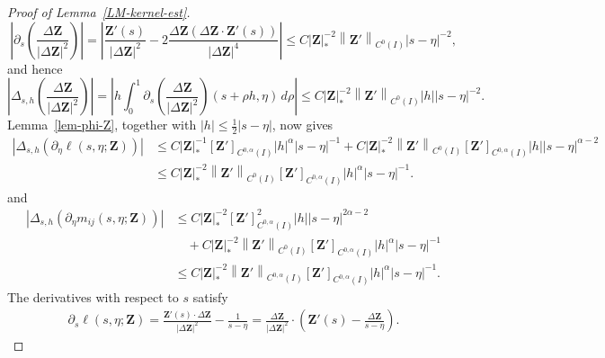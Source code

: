 \documentclass[11pt,reqno]{amsart}
\theoremstyle{plain}
\theoremstyle{definition}
\numberwithin{equation}{section}
\newcommand{\paren}[1]{\left(#1\right)}
\newcommand{\p}{\partial}
\newcommand{\bm}[1]{\boldsymbol{#1}}
\newcommand{\abs}[1]{\left\lvert #1 \right\rvert}
\newcommand{\norm}[1]{\left\lVert #1 \right\rVert}
\newcommand{\ci}[1]{C^{#1}(I)}
\begin{document}
\begin{proof}[Proof of Lemma~\ref{LM-kernel-est}]
\begin{equation}
    \abs{\p_s \paren{\frac{\Delta \bm Z}{\abs{\Delta\bm Z}^2}}} = \abs{\frac{\bm Z'(s)}{\abs{\Delta\bm Z}^2} - 2 \frac{\Delta\bm Z\paren{\Delta\bm Z\cdot\bm Z'(s)}}{\abs{\Delta\bm Z}^4}} \le C \abs{\bm Z}_*^{-2}\norm{\bm Z'}_{\ci{0}}\abs{s-\eta}^{-2},
\end{equation}
and hence
\begin{equation}
    \abs{\Delta_{s,h} \paren{\frac{\Delta \bm Z}{\abs{\Delta\bm Z}^2}}} =\abs{h\int_0^1 \p_s \paren{\frac{\Delta \bm Z}{\abs{\Delta\bm Z}^2}}(s+\rho h,\eta) \,d\rho}\le C \abs{\bm Z}_*^{-2}\norm{\bm Z'}_{\ci{0}}\abs{h}\abs{s-\eta}^{-2}.
\end{equation}
Lemma~\ref{lem-phi-Z}, together with
$\abs h\le\frac12\abs{s-\eta}$, now gives
\begin{equation}
\begin{aligned}
    \abs{\Delta_{s,h}(\p_\eta \ell(s,\eta;\bm Z))} &\le C \abs{\bm Z}_*^{-1}[\bm Z']_{\ci{0,\alpha}} \abs{h}^\alpha\abs{s-\eta}^{-1} + C \abs{\bm Z}_*^{-2}\norm{\bm Z'}_{\ci{0}}[\bm Z']_{\ci{0,\alpha}} \abs{h} \abs{s-\eta}^{\alpha-2} \\
    &\le C \abs{\bm Z}_*^{-2}\norm{\bm Z'}_{\ci{0}}[\bm Z']_{\ci{0,\alpha}}\abs{h}^\alpha\abs{s-\eta}^{-1}.
\end{aligned}
\end{equation}
and
\begin{equation}
\begin{aligned}
    \abs{\Delta_{s,h}(\p_\eta m_{ij}(s,\eta;\bm Z))} &\le C \abs{\bm Z}_*^{-2}[\bm Z']_{\ci{0,\alpha}}^2 \abs{h}\abs{s-\eta}^{2\alpha-2} \\
    &\quad + C\abs{\bm Z}_*^{-2}\norm{\bm Z'}_{\ci{0}}[\bm Z']_{\ci{0,\alpha}} \abs{h}^\alpha\abs{s-\eta}^{-1} \\
    &\le C \abs{\bm Z}_*^{-2}\norm{\bm Z'}_{\ci{0,\alpha}}[\bm Z']_{\ci{0,\alpha}}  \abs{h}^\alpha\abs{s-\eta}^{-1}.
\end{aligned}
\end{equation}
The derivatives with respect to $s$ satisfy
\begin{equation}\label{eqn:ell-s-derivative}
\begin{aligned}
    \p_s \ell(s,\eta;\bm Z) = \frac{\bm Z'(s)\cdot \Delta \bm Z}{|\Delta \bm Z|^2} - \frac{1}{s-\eta} = \frac{\Delta \bm Z}{\abs{\Delta\bm Z}^2}\cdot\paren{ \bm Z'(s) -\frac{\Delta \bm Z}{s-\eta}  }.
\end{aligned}
\end{equation}

\end{proof}
\end{document}
